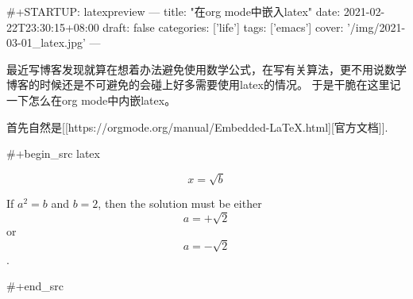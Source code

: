 #+STARTUP: latexpreview
---
title: "在org mode中嵌入latex"
date: 2021-02-22T23:30:15+08:00
draft: false
categories: ['life']
tags: ['emacs']
cover: '/img/2021-03-01_latex.jpg'
---

最近写博客发现就算在想着办法避免使用数学公式，在写有关算法，更不用说数学博客的时候还是不可避免的会碰上好多需要使用latex的情况。
于是干脆在这里记一下怎么在org mode中内嵌latex。

首先自然是[[https://orgmode.org/manual/Embedded-LaTeX.html][官方文档]].

#+begin_src latex

\begin{equation}                        %
x=\sqrt{b}                              %
\end{equation}                          %

If $a^2=b$ and \( b=2 \), then the solution must be
either $$ a=+\sqrt{2} $$ or \[ a=-\sqrt{2} \].

#+end_src

